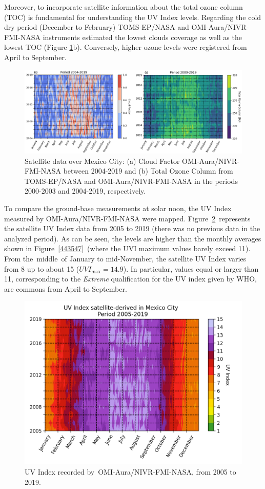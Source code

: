 \documentclass[10pt]{article}
\begin{document}
Moreover, to incorporate satellite information about the total ozone
column (TOC) is fundamental for understanding the UV Index levels.
Regarding the cold dry period (December to February) TOMS-EP/NASA and
OMI-Aura/NIVR-FMI-NASA instruments estimated the lowest clouds coverage
as well as the lowest TOC (Figure {\ref{573921}}b).
Conversely, higher ozone levels were registered from April to
September.~
\begin{figure}[H]
\begin{center}
\includegraphics[width=1.00\columnwidth]{figures/OzonoCloudDaily}
\caption{{Satellite data over Mexico City: (a) Cloud Factor OMI-Aura/NIVR-FMI-NASA
between 2004-2019 and (b) Total Ozone Column from TOMS-EP/NASA and
OMI-Aura/NIVR-FMI-NASA in the periods 2000-2003 and 2004-2019,
respectively.
{\label{573921}}%
}}
\end{center}
\end{figure}

To compare the ground-base measurements at solar noon, the UV Index
measured by OMI-Aura/NIVR-FMI-NASA were mapped.
Figure~{\ref{674611}}~represents the satellite UV Index
data from 2005 to 2019 (there was no previous data in the analyzed
period). As can be seen, the levels are higher than the monthly averages
shown in Figure~{\ref{443547}}~(where the UVI maximum
values barely exceed 11). From the~middle~of January to mid-November,
the satellite UV Index varies from 8 up to about 15
(\(UVI_{\max}=14.9\)). In particular, values equal or larger than 11,
corresponding to the \emph{Extreme} qualification for the UV index given
by WHO, are commons from April to September.
\begin{figure}[H]
\begin{center}
\includegraphics[width=0.70\columnwidth]{figures/UVI-OMI}
\caption{{UV Index recorded by~OMI-Aura/NIVR-FMI-NASA, from 2005 to 2019.
{\label{674611}}%
}}
\end{center}
\end{figure}
\end{document}
